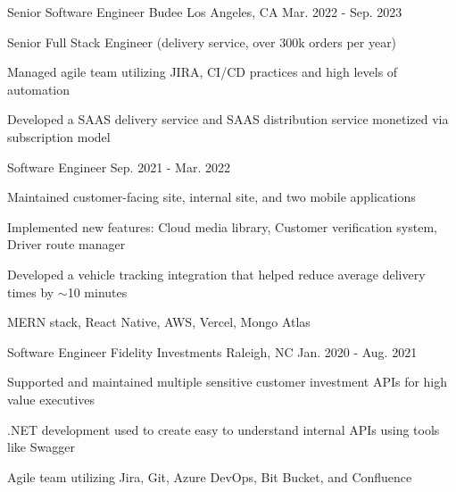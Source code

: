

\begin{cventries}


    \cventry
    {Senior Software Engineer} 
    {Budee} 
    {Los Angeles, CA} 
    {Mar. 2022 - Sep. 2023}
    {
      \begin{cvitems} 
        \item {Senior Full Stack Engineer (delivery service, over 300k orders per year)}
        \item {Managed agile team utilizing JIRA, CI/CD practices and high levels of automation}
        \item {Developed a SAAS delivery service and SAAS distribution service monetized via subscription model}
        \end{cvitems}
 	}


  \cventry
    {Software Engineer}
    {} %
    {} %
    {Sep. 2021 - Mar. 2022} %
    {
      \begin{cvitems}
        \item {Maintained customer-facing site, internal site, and two mobile applications}
        \item {Implemented new features: Cloud media library, Customer verification system, Driver route manager}
        \item {Developed a vehicle tracking integration that helped reduce average delivery times by $\sim$10 minutes}
        \item {MERN stack, React Native, AWS, Vercel, Mongo Atlas}
        \end{cvitems}
 	}


  \cventry
    {Software Engineer} %
    {Fidelity Investments} %
    {Raleigh, NC} %
    {Jan. 2020 - Aug. 2021} %
    {
      \begin{cvitems} %
        \item {Supported and maintained multiple sensitive customer investment APIs for high value executives}
        \item {.NET development used to create easy to understand internal APIs using tools like Swagger}
        \item {Agile team utilizing Jira, Git, Azure DevOps, Bit Bucket, and Confluence}
      \end{cvitems}
    }
    
\end{cventries}
